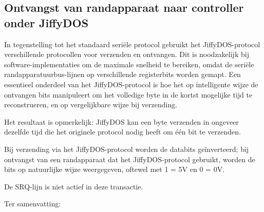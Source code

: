  \subsection{Ontvangst van randapparaat naar controller onder JiffyDOS{\texttrademark}}

In tegenstelling tot het standaard seriële protocol gebruikt het JiffyDOS{\texttrademark}-protocol verschillende protocollen voor verzenden en ontvangen. Dit is noodzakelijk bij software-implemen\-ta\-ties om de maximale snelheid te bereiken, omdat de seriële randapparatuurbus-lijnen op verschillende registerbits worden gemapt. Een essentieel onderdeel van het JiffyDOS{\texttrademark}-protocol is hoe het op intelligente wijze de ontvangen bits manipuleert om het volledige byte in de kortst mogelijke tijd te reconstrueren, en op vergelijkbare wijze bij verzending.

Het resultaat is opmerkelijk: JiffyDOS{\texttrademark} kan een byte verzenden in ongeveer dezelfde tijd die het originele protocol nodig heeft om één bit te verzenden.

Bij verzending via het JiffyDOS{\texttrademark}-protocol worden de databits geïnverteerd; bij ontvangst van een randapparaat dat het JiffyDOS{\texttrademark}-protocol gebruikt, worden de bits op natuurlijke wijze weergegeven, oftewel met 1 = 5V en 0 = 0V.

De SRQ-lijn is niet actief in deze transactie.

Ter samenvatting:

